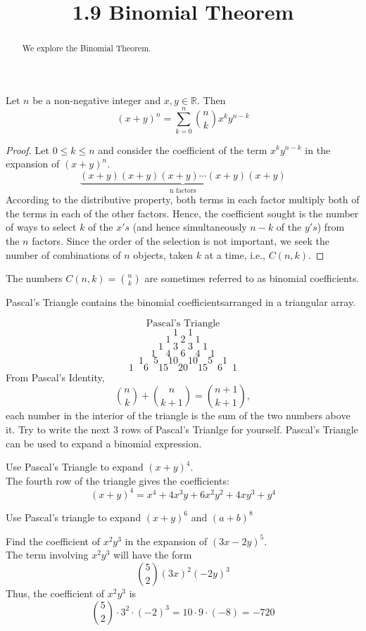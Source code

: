 \documentclass[handout]{ximera}
\title{1.9 Binomial Theorem}
\begin{document}
\begin{abstract}
We explore the Binomial Theorem.
\end{abstract}

\maketitle




\begin{theorem}
Let $n$ be a non-negative integer and $x, y \in \mathbb{R}$. Then
\[
(x+y)^n = \sum_{k=0}^n \binom{n}{k} x^ky^{n-k}
\]
\end{theorem}

\begin{proof}
Let $0 \leq k \leq n$ and consider the coefficient of the term $x^ky^{n-k}$ in the expansion of $(x+y)^n$.
\[
\underbrace{(x+y) (x+y) (x+y) \cdots (x+y) (x+y)}_{\mbox{n factors}}
\]
According to the distributive property, both terms in each factor multiply both of the terms in each of the other factors.
Hence, the coefficient sought is the number of ways to select $k$ of the $x's$ 
(and hence simultaneously $n-k$ of the $y's$) from the $n$ factors. 
Since the order of the selection is not important, we seek the number of combinations of $n$ objects, 
taken $k$ at a time, i.e., $C(n, k)$. 
\end{proof}

\begin{remark}
The numbers $C(n,k) = \binom{n}{k}$ are sometimes referred to as binomial coefficients.
\end{remark}

Pascal's Triangle contains the binomial coefficientsarranged in a triangular array.

\[
\mbox{Pascal's Triangle}
\]
\[
1 \quad 1
\]
\[
1\quad 2 \quad1
\]
\[
1\quad 3 \quad 3 \quad 1 
\]
\[
1\quad 4\quad 6\quad 4\quad 1
\]
\[
1\quad 5\quad 10\quad 10\quad 5\quad 1 
\]
\[
1\quad 6 \quad 15 \quad 20 \quad 15\quad 6 \quad 1
\]
From Pascal's Identity,
\[
\binom{n}{k} + \binom{n}{k+1} = \binom{n+1}{k+1},
\]
each number in the interior of the triangle is the sum of the two numbers above it.
Try to write the next 3 rows of Pascal's Trianlge for yourself.
Pascal's Triangle can be used to expand a  binomial expression.

\begin{example}
Use Pascal's Triangle to expand $(x+y)^4$.\\
The fourth row of the triangle gives the coefficients:
\[
(x+y)^4 = x^4 + 4x^3y + 6x^2y^2 + 4xy^3 + y^4
\]
\end{example}

\begin{problem}
Use Pascal's triangle to expand $(x+y)^6$ and $(a+b)^8$
\end{problem}

\begin{example}
Find the coefficient of $x^2y^3$ in the expansion of $(3x-2y)^5$.\\
The term involving $x^2y^3$ will have the form
\[
\binom{5}{2}(3x)^2(-2y)^3
\]
Thus, the coefficient of $x^2y^3$ is
\[
\binom{5}{2}\cdot 3^2 \cdot (-2)^3 = 10\cdot 9 \cdot (-8) = -720
\]
\end{example}
\end{document}
